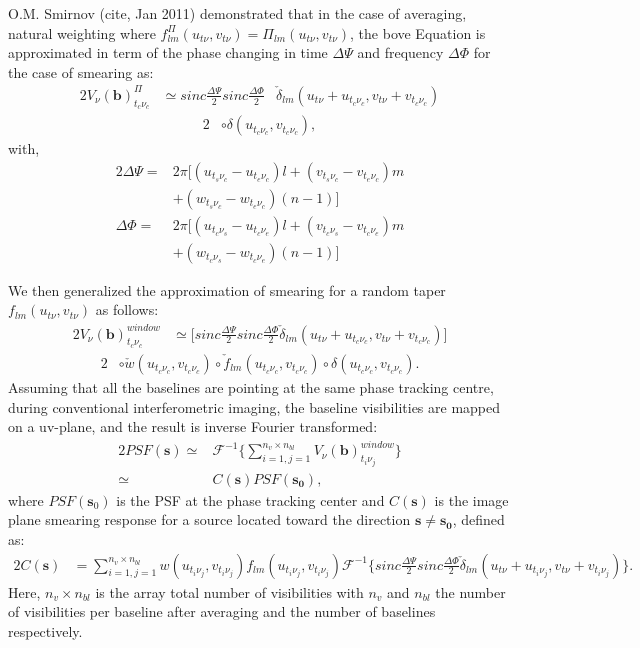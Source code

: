 O.M. Smirnov (cite, Jan 2011) demonstrated that in the case of averaging, natural weighting where
$f^{\Pi}_{lm}(u_{t\nu},v_{t\nu})=\Pi_{lm}(u_{t\nu},v_{t\nu})$, the bove Equation is approximated in term of the
phase changing in time $\Delta \Psi$ and frequency  $\Delta \Phi$ for the case
of smearing as:
\begin{alignat*}{2}
V_{\nu}(\mathbf{b})^{\Pi}_{t_c \nu_c} &\simeq sinc\frac{\Delta \Psi}{2}sinc\frac{\Delta \Phi}{2}&\check{\delta}_{lm}(u_{t\nu}+u_{t_c\nu_c}, v_{t\nu}+v_{t_c\nu_c})
\end{alignat*}
\begin{alignat}{2}
				      &\circ \delta(u_{t_c\nu_c},v_{t_c\nu_c})\label{eq:6},
\end{alignat}
with,
\begin{alignat*}{2}
\Delta \Psi =&2\pi \Big[(u_{t_s\nu_c}-u_{t_e\nu_c})l + (v_{t_s\nu_c}-v_{t_e\nu_c})m\\
	    & +(w_{t_s\nu_c}-w_{t_e\nu_c})(n-1)\Big]\\
\Delta \Phi =&2\pi \Big[(u_{t_c\nu_s}-u_{t_c\nu_e})l + (v_{t_c\nu_s}-v_{t_c\nu_e})m\\
	    & +(w_{t_c\nu_s}-w_{t_c\nu_e})(n-1)\Big]
\end{alignat*}

We then generalized the approximation of smearing for a
random taper $f_{lm}(u_{t\nu},v_{t\nu})$ as follows:
\begin{alignat*}{2}
V_{\nu}(\mathbf{b})^{window}_{t_c \nu_c} &\simeq \Bigg[sinc\frac{\Delta \Psi}{2}sinc\frac{\Delta \Phi}{2}\check{\delta}_{lm}(u_{t\nu}+u_{t_c\nu_c}, v_{t\nu}+v_{t_c\nu_c})\Bigg]
\end{alignat*}
\begin{alignat}{2}
					  & \circ \check{w}(u_{t_c\nu_c},v_{t_c\nu_c})\circ \check{f}_{lm}(u_{t_c\nu_c},v_{t_c\nu_c})\circ \delta(u_{t_c\nu_c},v_{t_c\nu_c})\label{eq:5}.
\end{alignat}
Assuming that all the baselines are pointing at the same phase tracking centre, during conventional interferometric imaging,
the baseline visibilities are mapped on a uv-plane, and the result is inverse Fourier transformed:
\begin{alignat}{2}
PSF(\mathbf{s}) \simeq & \mathcal{F}^{-1}\Bigg\{\sum_{i=1,j=1}^{n_v\times n_{bl}}V_{\nu}(\mathbf{b})^{window}_{t_i \nu_j}\Bigg\}\\
		\simeq & C(\mathbf{s})PSF(\mathbf{s_0}),
\end{alignat}
where $PSF(\mathbf{s}_0)$ is the PSF at the phase tracking center
and $C(\mathbf{s})$ is the image plane smearing response for a source
located toward the direction $\mathbf{s}\neq \mathbf{s_0}$, defined as:
\begin{alignat}{2}
C(\mathbf{s}) &= \sum_{i=1,j=1}^{n_v\times n_{bl}}w(u_{t_i\nu_j},v_{t_i\nu_j})f_{lm}(u_{t_i\nu_j},v_{t_i\nu_j})\mathcal{F}^{-1}\Bigg\{sinc\frac{\Delta \Psi}{2}sinc\frac{\Delta \Phi}{2}\check{\delta}_{lm}(u_{t\nu}+u_{t_i\nu_j}, v_{t\nu}+v_{t_i\nu_j})\Bigg\}.
\end{alignat}
Here, $n_v\times n_{bl}$ is the array total number of visibilities with $n_v$ and $n_{bl}$ the number of visibilities per 
baseline after averaging and the number of baselines respectively.


